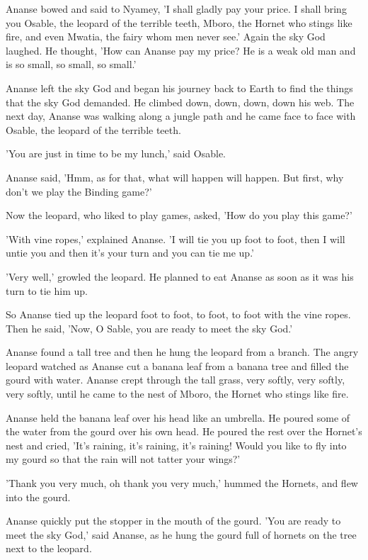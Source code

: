 Ananse bowed and said to Nyamey, 'I shall gladly pay your price. I shall bring you Osable, the leopard of the terrible teeth, Mboro, the Hornet who stings like fire, and even Mwatia, the fairy whom men never see.' Again the sky God laughed. He thought, 'How can Ananse pay my price? He is a weak old man and is so small, so small, so small.'

Ananse left the sky God and began his journey back to Earth to find the things that the sky God demanded. He climbed down, down, down, down his web. The next day, Ananse was walking along a jungle path and he came face to face with Osable, the leopard of the terrible teeth.

'You are just in time to be my lunch,' said Osable.

Ananse said, 'Hmm, as for that, what will happen will happen. But first, why don't we play the Binding game?'

Now the leopard, who liked to play games, asked, 'How do you play this game?'

'With vine ropes,' explained Ananse. 'I will tie you up foot to foot, then I will untie you and then it's your turn and you can tie me up.'

'Very well,' growled the leopard. He planned to eat Ananse as soon as it was his turn to tie him up.

So Ananse tied up the leopard foot to foot, to foot, to foot with the vine ropes. Then he said, 'Now, O Sable, you are ready to meet the sky God.'

Ananse found a tall tree and then he hung the leopard from a branch. The angry leopard watched as Ananse cut a banana leaf from a banana tree and filled the gourd with water. Ananse crept through the tall grass, very softly, very softly, very softly, until he came to the nest of Mboro, the Hornet who stings like fire.

Ananse held the banana leaf over his head like an umbrella. He poured some of the water from the gourd over his own head. He poured the rest over the Hornet's nest and cried, 'It's raining, it's raining, it's raining! Would you like to fly into my gourd so that the rain will not tatter your wings?'

'Thank you very much, oh thank you very much,' hummed the Hornets, and flew into the gourd.

Ananse quickly put the stopper in the mouth of the gourd. 'You are ready to meet the sky God,' said Ananse, as he hung the gourd full of hornets on the tree next to the leopard.

